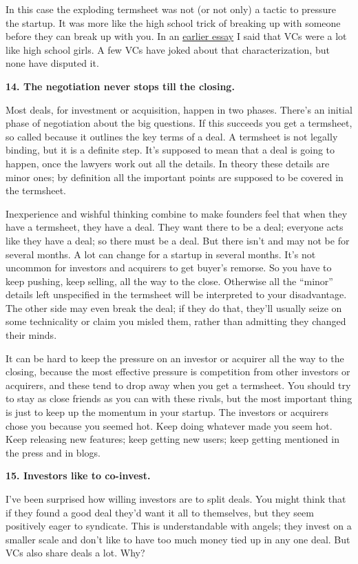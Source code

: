 In this case the exploding termsheet was not (or not only) a tactic to
pressure the startup. It was more like the high school trick of breaking
up with someone before they can break up with you. In an
\href{startupfunding.html}{earlier essay} I said that VCs were a lot
like high school girls. A few VCs have joked about that
characterization, but none have disputed it.

\textbf{14. The negotiation never stops till the closing.}

Most deals, for investment or acquisition, happen in two phases. There's
an initial phase of negotiation about the big questions. If this
succeeds you get a termsheet, so called because it outlines the key
terms of a deal. A termsheet is not legally binding, but it is a
definite step. It's supposed to mean that a deal is going to happen,
once the lawyers work out all the details. In theory these details are
minor ones; by definition all the important points are supposed to be
covered in the termsheet.

Inexperience and wishful thinking combine to make founders feel that
when they have a termsheet, they have a deal. They want there to be a
deal; everyone acts like they have a deal; so there must be a deal. But
there isn't and may not be for several months. A lot can change for a
startup in several months. It's not uncommon for investors and acquirers
to get buyer's remorse. So you have to keep pushing, keep selling, all
the way to the close. Otherwise all the ``minor'' details left
unspecified in the termsheet will be interpreted to your disadvantage.
The other side may even break the deal; if they do that, they'll usually
seize on some technicality or claim you misled them, rather than
admitting they changed their minds.

It can be hard to keep the pressure on an investor or acquirer all the
way to the closing, because the most effective pressure is competition
from other investors or acquirers, and these tend to drop away when you
get a termsheet. You should try to stay as close friends as you can with
these rivals, but the most important thing is just to keep up the
momentum in your startup. The investors or acquirers chose you because
you seemed hot. Keep doing whatever made you seem hot. Keep releasing
new features; keep getting new users; keep getting mentioned in the
press and in blogs.

\textbf{15. Investors like to co-invest.}

I've been surprised how willing investors are to split deals. You might
think that if they found a good deal they'd want it all to themselves,
but they seem positively eager to syndicate. This is understandable with
angels; they invest on a smaller scale and don't like to have too much
money tied up in any one deal. But VCs also share deals a lot. Why?

